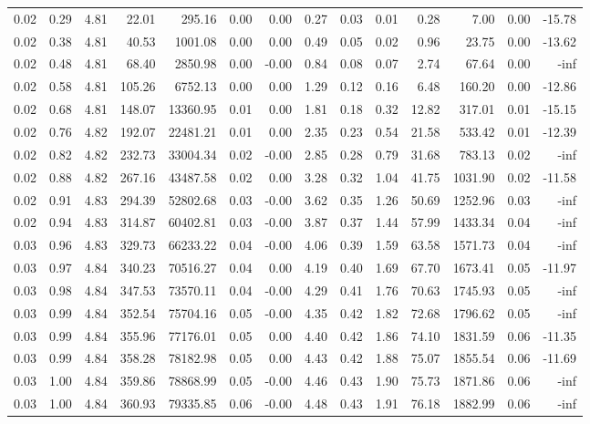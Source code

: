 \begin{table}[!ht]
\begin{tabular}{rrrrrrrrrrrrrr}
0.02 & 0.29 & 4.81 & 22.01 & 295.16 & 0.00 & 0.00 & 0.27 & 0.03 & 0.01 & 0.28 & 7.00 & 0.00 & -15.78 \\
0.02 & 0.38 & 4.81 & 40.53 & 1001.08 & 0.00 & 0.00 & 0.49 & 0.05 & 0.02 & 0.96 & 23.75 & 0.00 & -13.62 \\
0.02 & 0.48 & 4.81 & 68.40 & 2850.98 & 0.00 & -0.00 & 0.84 & 0.08 & 0.07 & 2.74 & 67.64 & 0.00 & -inf \\
0.02 & 0.58 & 4.81 & 105.26 & 6752.13 & 0.00 & 0.00 & 1.29 & 0.12 & 0.16 & 6.48 & 160.20 & 0.00 & -12.86 \\
0.02 & 0.68 & 4.81 & 148.07 & 13360.95 & 0.01 & 0.00 & 1.81 & 0.18 & 0.32 & 12.82 & 317.01 & 0.01 & -15.15 \\
0.02 & 0.76 & 4.82 & 192.07 & 22481.21 & 0.01 & 0.00 & 2.35 & 0.23 & 0.54 & 21.58 & 533.42 & 0.01 & -12.39 \\
0.02 & 0.82 & 4.82 & 232.73 & 33004.34 & 0.02 & -0.00 & 2.85 & 0.28 & 0.79 & 31.68 & 783.13 & 0.02 & -inf \\
0.02 & 0.88 & 4.82 & 267.16 & 43487.58 & 0.02 & 0.00 & 3.28 & 0.32 & 1.04 & 41.75 & 1031.90 & 0.02 & -11.58 \\
0.02 & 0.91 & 4.83 & 294.39 & 52802.68 & 0.03 & -0.00 & 3.62 & 0.35 & 1.26 & 50.69 & 1252.96 & 0.03 & -inf \\
0.02 & 0.94 & 4.83 & 314.87 & 60402.81 & 0.03 & -0.00 & 3.87 & 0.37 & 1.44 & 57.99 & 1433.34 & 0.04 & -inf \\
0.03 & 0.96 & 4.83 & 329.73 & 66233.22 & 0.04 & -0.00 & 4.06 & 0.39 & 1.59 & 63.58 & 1571.73 & 0.04 & -inf \\
0.03 & 0.97 & 4.84 & 340.23 & 70516.27 & 0.04 & 0.00 & 4.19 & 0.40 & 1.69 & 67.70 & 1673.41 & 0.05 & -11.97 \\
0.03 & 0.98 & 4.84 & 347.53 & 73570.11 & 0.04 & -0.00 & 4.29 & 0.41 & 1.76 & 70.63 & 1745.93 & 0.05 & -inf \\
0.03 & 0.99 & 4.84 & 352.54 & 75704.16 & 0.05 & -0.00 & 4.35 & 0.42 & 1.82 & 72.68 & 1796.62 & 0.05 & -inf \\
0.03 & 0.99 & 4.84 & 355.96 & 77176.01 & 0.05 & 0.00 & 4.40 & 0.42 & 1.86 & 74.10 & 1831.59 & 0.06 & -11.35 \\
0.03 & 0.99 & 4.84 & 358.28 & 78182.98 & 0.05 & 0.00 & 4.43 & 0.42 & 1.88 & 75.07 & 1855.54 & 0.06 & -11.69 \\
0.03 & 1.00 & 4.84 & 359.86 & 78868.99 & 0.05 & -0.00 & 4.46 & 0.43 & 1.90 & 75.73 & 1871.86 & 0.06 & -inf \\
0.03 & 1.00 & 4.84 & 360.93 & 79335.85 & 0.06 & -0.00 & 4.48 & 0.43 & 1.91 & 76.18 & 1882.99 & 0.06 & -inf \\

\end{tabular}
\end{table}
